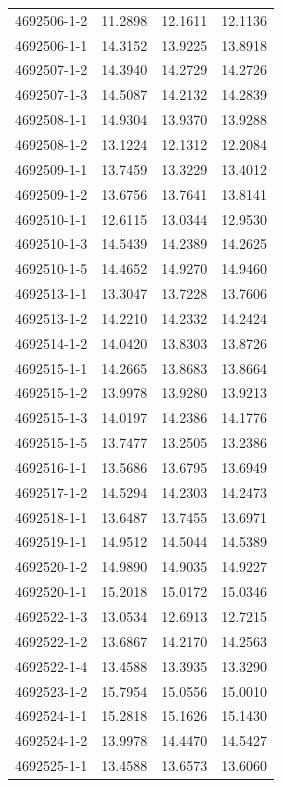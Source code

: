 \begin{longtable}{lrrr}
4692506-1-2 & 11.2898 & 12.1611 & 12.1136 \\
4692506-1-1 & 14.3152 & 13.9225 & 13.8918 \\
4692507-1-2 & 14.3940 & 14.2729 & 14.2726 \\
4692507-1-3 & 14.5087 & 14.2132 & 14.2839 \\
4692508-1-1 & 14.9304 & 13.9370 & 13.9288 \\
4692508-1-2 & 13.1224 & 12.1312 & 12.2084 \\
4692509-1-1 & 13.7459 & 13.3229 & 13.4012 \\
4692509-1-2 & 13.6756 & 13.7641 & 13.8141 \\
4692510-1-1 & 12.6115 & 13.0344 & 12.9530 \\
4692510-1-3 & 14.5439 & 14.2389 & 14.2625 \\
4692510-1-5 & 14.4652 & 14.9270 & 14.9460 \\
4692513-1-1 & 13.3047 & 13.7228 & 13.7606 \\
4692513-1-2 & 14.2210 & 14.2332 & 14.2424 \\
4692514-1-2 & 14.0420 & 13.8303 & 13.8726 \\
4692515-1-1 & 14.2665 & 13.8683 & 13.8664 \\
4692515-1-2 & 13.9978 & 13.9280 & 13.9213 \\
4692515-1-3 & 14.0197 & 14.2386 & 14.1776 \\
4692515-1-5 & 13.7477 & 13.2505 & 13.2386 \\
4692516-1-1 & 13.5686 & 13.6795 & 13.6949 \\
4692517-1-2 & 14.5294 & 14.2303 & 14.2473 \\
4692518-1-1 & 13.6487 & 13.7455 & 13.6971 \\
4692519-1-1 & 14.9512 & 14.5044 & 14.5389 \\
4692520-1-2 & 14.9890 & 14.9035 & 14.9227 \\
4692520-1-1 & 15.2018 & 15.0172 & 15.0346 \\
4692522-1-3 & 13.0534 & 12.6913 & 12.7215 \\
4692522-1-2 & 13.6867 & 14.2170 & 14.2563 \\
4692522-1-4 & 13.4588 & 13.3935 & 13.3290 \\
4692523-1-2 & 15.7954 & 15.0556 & 15.0010 \\
4692524-1-1 & 15.2818 & 15.1626 & 15.1430 \\
4692524-1-2 & 13.9978 & 14.4470 & 14.5427 \\
4692525-1-1 & 13.4588 & 13.6573 & 13.6060 \\

\end{longtable}
